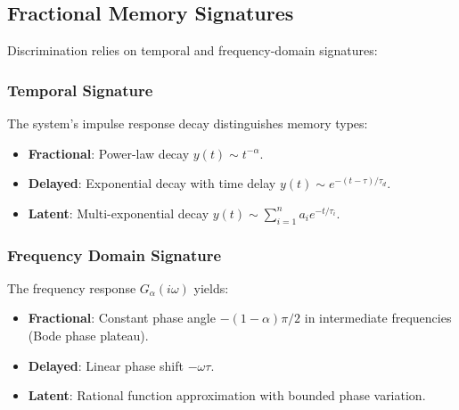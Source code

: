 \subsection{Fractional Memory Signatures}
Discrimination relies on temporal and frequency-domain signatures:

\subsubsection{Temporal Signature}
The system's impulse response decay distinguishes memory types:
\begin{itemize}
    \item \textbf{Fractional}: Power-law decay $y(t) \sim t^{-\alpha}$.
    \item \textbf{Delayed}: Exponential decay with time delay $y(t) \sim e^{-(t-\tau)/\tau_d}$.
    \item \textbf{Latent}: Multi-exponential decay $y(t) \sim \sum_{i=1}^n a_i e^{-t/\tau_i}$.
\end{itemize}

\subsubsection{Frequency Domain Signature}
The frequency response $G_\alpha(i\omega)$ yields:
\begin{itemize}
    \item \textbf{Fractional}: Constant phase angle $-(1-\alpha)\pi/2$ in intermediate frequencies (Bode phase plateau).
    \item \textbf{Delayed}: Linear phase shift $-\omega\tau$.
    \item \textbf{Latent}: Rational function approximation with bounded phase variation.
\end{itemize}

